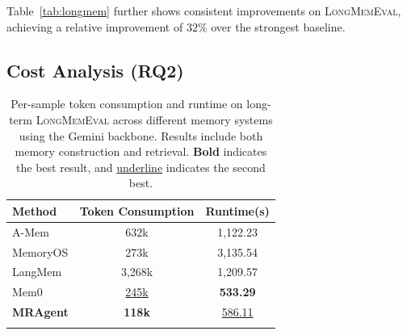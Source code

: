 \documentclass{llmxive}
\begin{document}
Table~\ref{tab:longmem} further shows consistent improvements on \textsc{LongMemEval}, achieving a relative improvement of $32\%$ over the strongest baseline.




\subsection{Cost Analysis (RQ2)}




\begin{table}[t]
\centering
\small
\setlength{\tabcolsep}{6pt}
\begin{tabular}{lcc}
\toprule
Method & Token Consumption & Runtime(s) \\
\midrule
A-Mem     & 632k              & 1,122.23 \\
MemoryOS & 273k              & 3,135.54 \\
LangMem  & 3,268k             & 1,209.57 \\
Mem0     & \underline{245k}  & \textbf{533.29} \\
\textbf{MRAgent} & \textbf{118k} & \underline{586.11} \\
\bottomrule
\label{tab:token-consumption}
\end{tabular}
\caption{Per-sample token consumption and runtime on long-term
\textsc{LongMemEval} across different memory systems using the Gemini backbone.
Results include both memory construction and retrieval.
\textbf{Bold} indicates the best result, and \underline{underline} indicates the
second best.}
\end{table}
\end{document}
